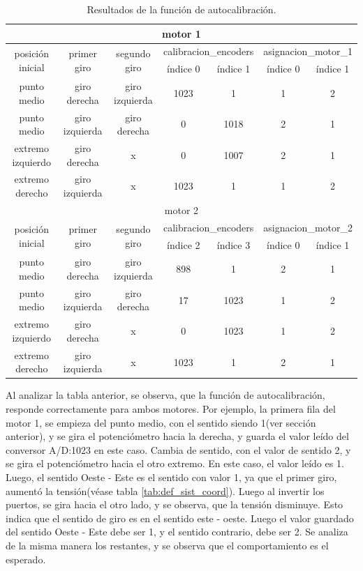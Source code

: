 \begin{table}[ht!]
	\begin{tabular}{|c|c|c|c|c|c|c|}
		\hline 
		\multicolumn{7}{|c|}{motor 1} \\
		\hline 
		\multirow{2}{*}{posición inicial} & 
		\multirow{2}{*}{primer giro} &\multirow{2}{*}{segundo giro} & \multicolumn{2}{l|}{calibracion\_encoders}& \multicolumn{2}{l|}{asignacion\_motor\_1} \\ \cline{4-7} 
		   & & & índice 0 &índice 1 &índice 0 &  índice 1 \\
		 \hline 
	      punto medio & giro derecha & giro izquierda & 1023 & 1 & 1 & 2 \\
	     \hline 
		 punto medio & giro izquierda & giro derecha & 0 & 1018 & 2 & 1 \\
		 \hline 	
		extremo izquierdo & giro derecha & x & 0 & 1007 & 2 & 1 \\
		\hline 
	    extremo derecho & giro izquierda & x & 1023 & 1 & 1 & 2 \\
		\hline 	
		\hline
		
		\multicolumn{7}{|c|}{motor 2} \\
		\hline 
		
		\multirow{2}{*}{posición inicial} & 
		\multirow{2}{*}{primer giro} &\multirow{2}{*}{segundo giro} & \multicolumn{2}{l|}{calibracion\_encoders}& \multicolumn{2}{l|}{asignacion\_motor\_2} \\ \cline{4-7} 
		   & & & índice 2 &índice 3 &índice 0 &  índice 1 \\ 
		\hline 
		 punto medio & giro derecha & giro izquierda & 898 & 1 & 2 & 1  \\
		\hline 
		 punto medio & giro izquierda & giro derecha & 17 & 1023 & 1 &2  \\
		\hline 	
		 extremo izquierdo & giro derecha & x & 0 & 1023 & 1 &2  \\
		\hline 
		 extremo derecho & giro izquierda & x & 1023 & 1 & 2 & 1 \\
		\hline
		\end{tabular}
	\caption{Resultados de la función de autocalibración.}
	\label{tab:resultados_autocalibracion}
\end{table}

Al analizar la tabla anterior, se observa, que la función de autocalibración, responde correctamente para ambos motores. Por ejemplo, la primera fila del motor 1, se empieza del punto medio, con el sentido siendo 1(ver sección anterior), y se gira el potenciómetro hacia la derecha, y guarda el valor leído del conversor A/D:1023 en este caso. Cambia de sentido, con el valor de sentido 2, y se gira el potenciómetro hacia el otro extremo. En este caso, el valor leído es 1. Luego, el sentido Oeste - Este es el sentido con valor 1, ya que el primer giro, aumentó la tensión(véase tabla \ref{tab:def_sist_coord}). Luego al invertir los puertos, se gira hacia el otro lado, y se observa, que la tensión disminuye. Esto indica que el sentido de giro es en el sentido este - oeste. Luego el valor guardado del sentido Oeste - Este debe ser 1, y el sentido contrario, debe ser 2. Se analiza de la misma manera los restantes, y se observa que el comportamiento es el esperado. 

